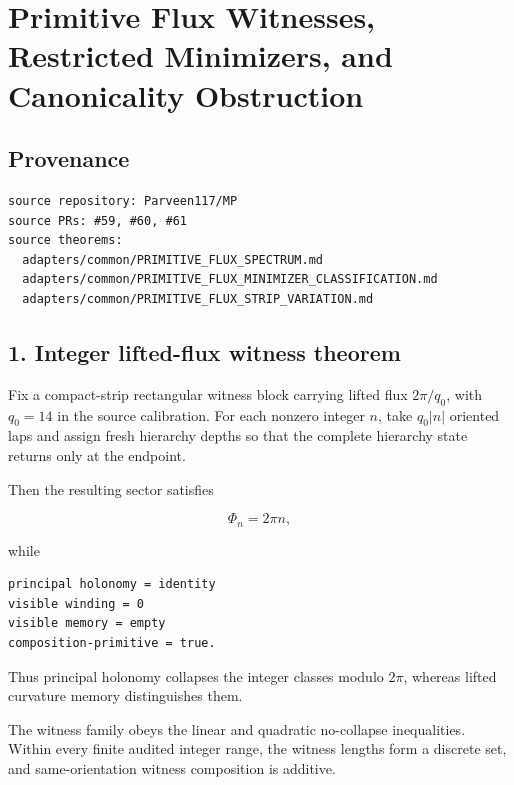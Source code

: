 \hypertarget{primitive-flux-witnesses-restricted-minimizers-and-canonicality-obstruction}{%
\chapter{Primitive Flux Witnesses, Restricted Minimizers, and Canonicality Obstruction}\label{primitive-flux-witnesses-restricted-minimizers-and-canonicality-obstruction}}

\hypertarget{provenance}{%
\section{Provenance}\label{provenance}}

\begin{verbatim}
source repository: Parveen117/MP
source PRs: #59, #60, #61
source theorems:
  adapters/common/PRIMITIVE_FLUX_SPECTRUM.md
  adapters/common/PRIMITIVE_FLUX_MINIMIZER_CLASSIFICATION.md
  adapters/common/PRIMITIVE_FLUX_STRIP_VARIATION.md
\end{verbatim}

\hypertarget{integer-lifted-flux-witness-theorem}{%
\section{1. Integer lifted-flux witness theorem}\label{integer-lifted-flux-witness-theorem}}

Fix a compact-strip rectangular witness block carrying lifted flux \(2\pi/q_0\), with \(q_0=14\) in the source calibration. For each nonzero integer \(n\), take \(q_0|n|\) oriented laps and assign fresh hierarchy depths so that the complete hierarchy state returns only at the endpoint.

Then the resulting sector satisfies

\[
\boxed{\Phi_n=2\pi n,}
\]

while

\begin{verbatim}
principal holonomy = identity
visible winding = 0
visible memory = empty
composition-primitive = true.
\end{verbatim}

Thus principal holonomy collapses the integer classes modulo \(2\pi\), whereas lifted curvature memory distinguishes them.

The witness family obeys the linear and quadratic no-collapse inequalities. Within every finite audited integer range, the witness lengths form a discrete set, and same-orientation witness composition is additive.

